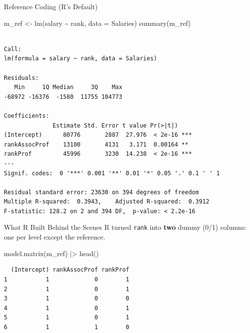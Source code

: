 \documentclass[
  ignorenonframetext,
  aspectratio=169,
]{beamer}
\newenvironment{Shaded}{\begin{snugshade}}{\end{snugshade}}
\newcommand{\AttributeTok}[1]{\textcolor[rgb]{0.40,0.45,0.13}{#1}}
\newcommand{\FunctionTok}[1]{\textcolor[rgb]{0.28,0.35,0.67}{#1}}
\newcommand{\NormalTok}[1]{\textcolor[rgb]{0.00,0.23,0.31}{#1}}
\newcommand{\OtherTok}[1]{\textcolor[rgb]{0.00,0.23,0.31}{#1}}
\newcommand{\SpecialCharTok}[1]{\textcolor[rgb]{0.37,0.37,0.37}{#1}}
\begin{document}
\begin{frame}[fragile]{Reference Coding (R's Default)}
\protect\hypertarget{sec-ref-coding}{}
\begin{Shaded}
\begin{Highlighting}[]
\NormalTok{m\_ref }\OtherTok{\textless{}{-}} \FunctionTok{lm}\NormalTok{(salary }\SpecialCharTok{\textasciitilde{}}\NormalTok{ rank, }\AttributeTok{data =}\NormalTok{ Salaries)}
\FunctionTok{summary}\NormalTok{(m\_ref)}
\end{Highlighting}
\end{Shaded}

\begin{verbatim}

Call:
lm(formula = salary ~ rank, data = Salaries)

Residuals:
   Min     1Q Median     3Q    Max 
-68972 -16376  -1580  11755 104773 

Coefficients:
              Estimate Std. Error t value Pr(>|t|)    
(Intercept)      80776       2887  27.976  < 2e-16 ***
rankAssocProf    13100       4131   3.171  0.00164 ** 
rankProf         45996       3230  14.238  < 2e-16 ***
---
Signif. codes:  0 '***' 0.001 '**' 0.01 '*' 0.05 '.' 0.1 ' ' 1

Residual standard error: 23630 on 394 degrees of freedom
Multiple R-squared:  0.3943,    Adjusted R-squared:  0.3912 
F-statistic: 128.2 on 2 and 394 DF,  p-value: < 2.2e-16
\end{verbatim}
\end{frame}

\begin{frame}[fragile]{What R Built Behind the Scenes}
\protect\hypertarget{what-r-built-behind-the-scenes}{}
R turned \texttt{rank} into \textbf{two} dummy (0/1) columns: one per
level except the reference.

\begin{Shaded}
\begin{Highlighting}[]
\FunctionTok{model.matrix}\NormalTok{(m\_ref) }\SpecialCharTok{|\textgreater{}} \FunctionTok{head}\NormalTok{()}
\end{Highlighting}
\end{Shaded}

\begin{verbatim}
  (Intercept) rankAssocProf rankProf
1           1             0        1
2           1             0        1
3           1             0        0
4           1             0        1
5           1             0        1
6           1             1        0
\end{verbatim}
\end{frame}
\end{document}
